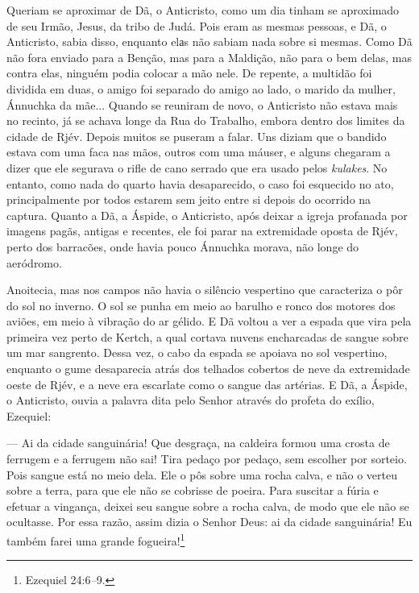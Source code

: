 Queriam se aproximar de Dã, o Anticristo, como um dia tinham se
aproximado de seu Irmão, Jesus, da tribo de Judá. Pois eram as mesmas
pessoas, e Dã, o Anticristo, sabia disso, enquanto elаs não sabiam nada
sobre si mesmas. Como Dã não fora enviado para a Benção, mas para a
Maldição, não para o bem delas, mas contra elas, ninguém podia colocar a
mão nele. De repente, a multidão foi dividida em duas, o amigo foi
separado do amigo ao lado, o marido da mulher, Ánnuchka da mãe... Quando
se reuniram de novo, o Anticristo não estava mais no recinto, já se
achava longe da Rua do Trabalho, embora dentro dos limites da cidade de
Rjév. Depois muitos se puseram a falar. Uns diziam que o bandido estava
com uma faca nas mãos, outros com uma máuser, e alguns chegaram a dizer
que ele segurava o rifle de cano serrado que era usado pelos
\emph{kulakes}. No entanto, como nada do quarto havia desaparecido, o
caso foi esquecido no ato, principalmente por todos estarem sem jeito
entre si depois do ocorrido na captura. Quanto a Dã, a Áspide, o
Anticristo, após deixar a igreja profanada por imagens pagãs, antigas e
recentes, ele foi parar na extremidade oposta de Rjév, perto dos
barracões, onde havia pouco Ánnuchka morava, não longe do aeródromo.

Anoitecia, mas nos campos não havia o silêncio vespertino que
caracteriza o pôr do sol no inverno. O sol se punha em meio ao barulho e
ronco dos motores dos aviões, em meio à vibração do ar gélido. E Dã
voltou a ver a espada que vira pela primeira vez perto de Kertch, a qual
cortava nuvens encharcadas de sangue sobre um mar sangrento. Dessa vez,
o cabo da espada se apoiava no sol vespertino, enquanto o gume
desaparecia atrás dos telhados cobertos de neve da extremidade oeste de
Rjév, e a neve era escarlate como o sangue das artérias. E Dã, a Áspide,
o Anticristo, ouvia a palavra dita pelo Senhor através do profeta do
exílio, Ezequiel:

--- Ai da cidade sanguinária! Que desgraça, na caldeira formou uma
crosta de ferrugem e a ferrugem não sai! Tira pedaço por pedaço, sem
escolher por sorteio. Pois sangue está no meio dela. Ele o pôs sobre uma
rocha calva, e não o verteu sobre a terra, para que ele não se cobrisse
de poeira. Para suscitar a fúria e efetuar a vingança, deixei seu sangue
sobre a rocha calva, de modo que ele não se ocultasse. Por essa razão,
assim dizia o Senhor Deus: ai da cidade sanguinária! Eu também farei uma
grande fogueira!\footnote{Ezequiel 24:6\emph{--}9.}

